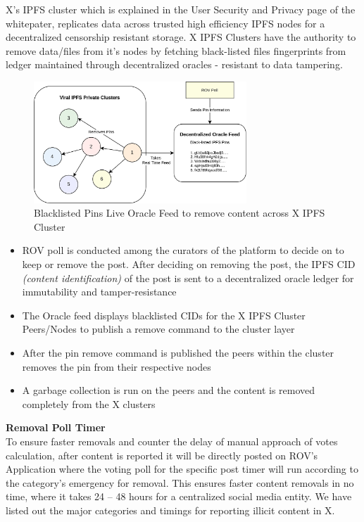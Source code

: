 \documentclass[letterpaper,11pt]{article}
\begin{document}
X's IPFS cluster which is explained in the User Security and Privacy page of the whitepater, replicates data across trusted high efficiency IPFS nodes for a decentralized censorship resistant storage. X IPFS Clusters have the authority to remove data/files from it's nodes by fetching black-listed files fingerprints from ledger maintained through decentralized oracles - resistant to data tampering.\\

\begin{figure}[H]
\begin{center}
\includegraphics[width=8cm]{content-removal}
\end{center}
\caption{Blacklisted Pins Live Oracle Feed to remove content across X IPFS Cluster}
\end{figure}

\begin{itemize}[wide, labelwidth=!, labelindent=0pt]
\item ROV poll is conducted among the curators of the platform to decide on to keep or remove the post.  After deciding on removing the post,  the IPFS CID \textit{(content identification)} of the post is sent to a decentralized oracle ledger for immutability and tamper-resistance
\item The Oracle feed displays blacklisted CIDs for the X IPFS Cluster Peers/Nodes to publish a remove command to the cluster layer
\item After the pin remove command is published the peers within the cluster removes the pin from their respective nodes
\item A garbage collection is run on the peers and the content is removed completely from the X clusters
\end{itemize}



\textbf{Removal Poll Timer}\\

To ensure faster removals and counter the delay of manual approach of votes calculation, after content is reported it will be directly posted on ROV’s Application where the voting poll for the specific post timer will run according to the category’s emergency for removal. This ensures faster content removals in no time, where it takes 24 – 48 hours for a centralized social media entity. We have listed out the major categories and timings for reporting illicit content in X.
\end{document}
